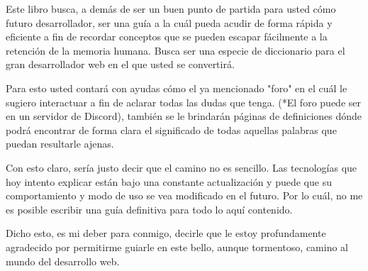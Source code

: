 \documentclass{article}
\begin{document}
Este libro busca, a demás de ser un buen punto de partida para usted cómo futuro desarrollador, ser una guía a la cuál pueda acudir de forma rápida y eficiente a fin de recordar conceptos que se pueden escapar fácilmente a la retención de la memoria humana. Busca ser una especie de diccionario para el gran desarrollador web en el que usted se convertirá.

Para esto usted contará con ayudas cómo el ya mencionado "foro" en el cuál le sugiero interactuar a fin de aclarar todas las dudas que tenga. (*El foro puede ser en un servidor de Discord), también se le brindarán páginas de definiciones dónde podrá encontrar de forma clara el significado de todas aquellas palabras que puedan resultarle ajenas.

Con esto claro, sería justo decir que el camino no es sencillo. Las tecnologías que hoy intento explicar están bajo una constante actualización y puede que su comportamiento y modo de uso se vea modificado en el futuro. Por lo cuál, no me es posible escribir una guía definitiva para todo lo aquí contenido.

Dicho esto, es mi deber para conmigo, decirle que le estoy profundamente agradecido por permitirme guiarle en este bello, aunque tormentoso, camino al mundo del desarrollo web.
\end{document}
